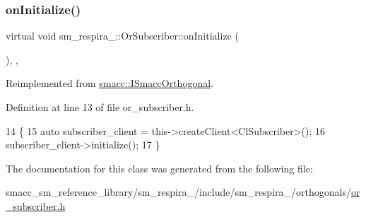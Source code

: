 \subsubsection{\texorpdfstring{on\+Initialize()}{onInitialize()}}
{\footnotesize\ttfamily virtual void sm\+\_\+respira\+\_\+::\+Or\+Subscriber\+::on\+Initialize (\begin{DoxyParamCaption}{ }\end{DoxyParamCaption})\hspace{0.3cm}{\ttfamily [inline]}, {\ttfamily [override]}, {\ttfamily [virtual]}}



Reimplemented from \hyperlink{classsmacc_1_1ISmaccOrthogonal_a6bb31c620cb64dd7b8417f8705c79c7a}{smacc\+::\+I\+Smacc\+Orthogonal}.



Definition at line 13 of file or\+\_\+subscriber.\+h.


\begin{DoxyCode}
14     \{
15         \textcolor{keyword}{auto} subscriber\_client = this->createClient<ClSubscriber>();
16         subscriber\_client->initialize();
17     \}
\end{DoxyCode}


The documentation for this class was generated from the following file\+:\begin{DoxyCompactItemize}
\item 
smacc\+\_\+sm\+\_\+reference\+\_\+library/sm\+\_\+respira\+\_/include/sm\+\_\+respira\+\_/orthogonals/\hyperlink{sm__respira__1_2include_2sm__respira__1_2orthogonals_2or__subscriber_8h}{or\+\_\+subscriber.\+h}\end{DoxyCompactItemize}

